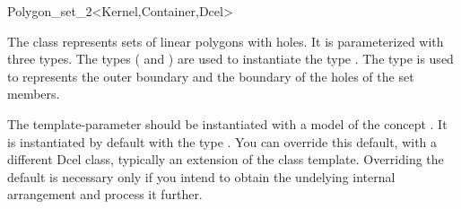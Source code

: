 \ccRefPageBegin

\begin{ccRefClass}{Polygon_set_2<Kernel,Container,Dcel>}

\ccThreeToTwo
    
\ccDefinition

The class \ccRefName{} represents sets of linear polygons with holes.
It is parameterized with three types. The types ( and 
) are used to instantiate the type 
. The type  is used 
to represents the outer boundary and the boundary of the holes of the set 
members.

The  template-parameter should be instantiated with a
model of the concept . It is instantiated
by default with the type . You can override 
this default, with a different {\sc Dcel} class, typically an extension
of the  class template. Overriding the default is 
necessary only if you intend to obtain the undelying internal arrangement 
and process it further.


\ccInheritsFrom

\ccSeeAlso
  \\

\end{ccRefClass}
\ccRefPageEnd
